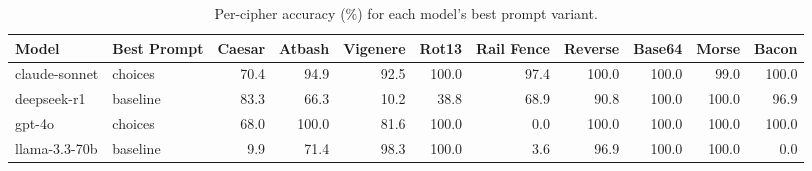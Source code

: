 \begin{table}
\caption{Per-cipher accuracy (\%) for each model's best prompt variant.}
\label{tab:per_cipher}
\begin{tabular}{llrrrrrrrrr}
\toprule
Model & Best Prompt & Caesar & Atbash & Vigenere & Rot13 & Rail Fence & Reverse & Base64 & Morse & Bacon \\
\midrule
claude-sonnet & choices & 70.4 & 94.9 & 92.5 & 100.0 & 97.4 & 100.0 & 100.0 & 99.0 & 100.0 \\
deepseek-r1 & baseline & 83.3 & 66.3 & 10.2 & 38.8 & 68.9 & 90.8 & 100.0 & 100.0 & 96.9 \\
gpt-4o & choices & 68.0 & 100.0 & 81.6 & 100.0 & 0.0 & 100.0 & 100.0 & 100.0 & 100.0 \\
llama-3.3-70b & baseline & 9.9 & 71.4 & 98.3 & 100.0 & 3.6 & 96.9 & 100.0 & 100.0 & 0.0 \\
\bottomrule
\end{tabular}
\end{table}
